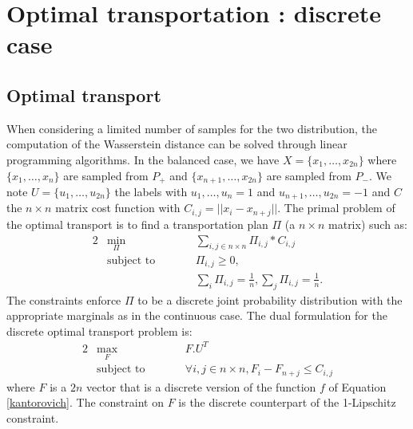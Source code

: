 \def\pd{\partial}
\def\sen{\mathop{\rm sen}\nolimits} %
\def\senh{\mathop{\rm senh}\nolimits}
\def\N{\mathbb{N}}
\def\Z{\mathbb{Z}}
\def\Q{\mathbb{Q}}
\def\R{\mathbb{R}}
\def\C{\mathbb{C}} 
\newtheorem {Lemma}[Proposition] {Lemma}
\newtheorem {Corollary}[Proposition]{Corollary}
\newtheorem {Remark}[Proposition]{Remark}
\newtheorem {Example}{Example}[section]
\newtheorem {Definition}{Definition}[section]
\newtheorem {Figure}{Figure}[section]
\newpage
\appendix

\section{Optimal transportation : discrete case}
\subsection{Optimal transport}
\label{secOptTransp}
When considering a limited number of samples for the two distribution, the computation of the Wasserstein distance 
can be solved through linear programming algorithms. In the balanced case, we have $X=\{x_1, \ldots, x_{2n}\}$ where $\{x_1,\ldots,x_n\}$ are sampled from $P_+$ and  $\{x_{n+1},\ldots,x_{2n}\}$ are sampled from $P_-$. We note $U=\{u_1, \ldots, u_{2n}\}$ the labels with $u_1,\ldots,u_n=1$ and $u_{n+1},\ldots,u_{2n}=-1$ and $C$ the $n\times n$ matrix cost function with $C_{i,j}=||x_i-x_{n+j}||$. The primal problem of the optimal transport is to find a transportation plan $\Pi$ (a $n\times n$ matrix) such as:
\begin{alignat}{2}
&\!\min_{\Pi}        &\qquad& \sum_{i,j \in n\times n}\Pi_{i,j}*C_{i,j}\\
&\text{subject to} &      & \Pi_{i,j} \geq 0,\\
&                  &      & \sum_i \Pi_{i,j} = \frac{1}{n},\sum_j \Pi_{i,j} = \frac{1}{n}.
\end{alignat}
The constraints enforce $\Pi$ to be a discrete joint probability distribution with the appropriate marginals as in the continuous case. The dual formulation for the discrete optimal transport problem is:
\begin{alignat}{2}
&\!\max_{F}        &\qquad& F.U^T\\
&\text{subject to} &      & \forall i,j \in n\times n, F_i-F_{n+j}\leq C_{i,j}
\end{alignat}
where $F$ is a $2n$ vector that is a discrete version of the function $f$ of Equation \ref{kantorovich}. The constraint on $F$ is the discrete counterpart of the 1-Lipschitz constraint. 

